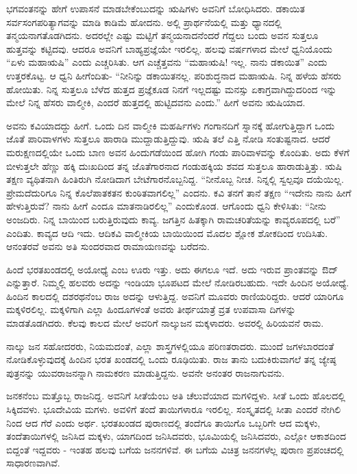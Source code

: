 ಭಗವಂತನನ್ನು ಹೇಗೆ ಉಪಾಸನೆ ಮಾಡಬೇಕೆಂಬುದನ್ನು ಋಷಿಗಳು ಅವನಿಗೆ ಬೋಧಿಸಿದರು. ಡಕಾಯಿತ ಸರ್ವಸಂಗಪರಿತ್ಯಾಗವನ್ನು ಮಾಡಿ ಕಾಡಿಮೆ ಹೋದನು. ಅಲ್ಲಿ ಪ್ರಾರ್ಥನೆಯಲ್ಲಿ ಮತ್ತು ಧ್ಯಾನದಲ್ಲಿ ತನ್ಮಯನಾಗತೊಡಗಿದನು. ಅದರಲ್ಲೇ ಎಷ್ಟು ಮಟ್ಟಿಗೆ ತನ್ಮಯನಾದನೆಂದರೆ ಗೆದ್ದಲು ಬಂದು ಅವನ ಸುತ್ತಲೂ ಹುತ್ತವನ್ನು ಕಟ್ಟಿದವು. ಆದರೂ ಅವನಿಗೆ ಬಾಹ್ಯಪ್ರಜ್ಞೆಯೇ ಇರಲಿಲ್ಲ. ಹಲವು ವರ್ಷಗಳಾದ ಮೇಲೆ ಧ್ವನಿಯೊಂದು “ಏಳು ಮಹಾಋಷಿ” ಎಂದು ಎಚ್ಚರಿಸಿತು. ಆಗ ಎಚ್ಚೆತ್ತವನು “ಮಹಾಋಷಿ! ಇಲ್ಲ. ನಾನು ಡಕಾಯಿತ” ಎಂದು ಉತ್ತರಕೊಟ್ಟ. ಆ ಧ್ವನಿ ಹೀಗೆಂದಿತು- “ನೀನಿನ್ನು ಡಕಾಯಿತನಲ್ಲ. ಪರಿಶುದ್ಧನಾದ ಮಹಾಋಷಿ. ನಿನ್ನ ಹಳೆಯ ಹೆಸರು ಹೋಯಿತು. ನಿನ್ನ ಸುತ್ತಲೂ ಬೆಳೆದ ಹುತ್ತದ ಪ್ರಜ್ಞೆಕೂಡ ನಿನಗೆ ಇಲ್ಲದಷ್ಟು ಮನಸ್ಸು ಏಕಾಗ್ರವಾಗಿದ್ದುದರಿಂದ ಇನ್ನು ಮೇಲೆ ನಿನ್ನ ಹೆಸರು ವಾಲ್ಮೀಕಿ, ಎಂದರೆ ಹುತ್ತದಲ್ಲಿ ಹುಟ್ಟಿದವನು ಎಂದು.” ಹೀಗೆ ಅವನು ಋಷಿಯಾದ.

ಅವನು ಕವಿಯಾದದ್ದು ಹೀಗೆ. ಒಂದು ದಿನ ವಾಲ್ಮೀಕಿ ಮಹರ್ಷಿಗಳು ಗಂಗಾನದಿಗೆ ಸ್ನಾನಕ್ಕೆ ಹೋಗುತ್ತಿದ್ದಾಗ ಒಂದು ಜೊತೆ ಪಾರಿವಾಳಗಳು ಸುತ್ತಲೂ ಹಾರಾಡಿ ಮುದ್ದಾಡುತ್ತಿದ್ದುವು. ಋಷಿ ತಲೆ ಎತ್ತಿ ನೋಡಿ ಸಂತುಷ್ಟನಾದ. ಆದರೆ ಮರುಕ್ಷಣದಲ್ಲಿಯೇ ಒಂದು ಬಾಣ ಅವನ ಹಿಂದುಗಡೆಯಿಂದ ಹೋಗಿ ಗಂಡು ಪಾರಿವಾಳವನ್ನು ಕೊಂದಿತು. ಅದು ಕೆಳಗೆ ಬೀಳುತ್ತಲೇ ಹೆಣ್ಣು ಹಕ್ಕಿ ದುಃಖದಿಂದ ತನ್ನ ಜೊತೆಗಾರನಾದ ಗಂಡುಹಕ್ಕಿಯ ಶವದ ಸುತ್ತಲೂ ಹಾರಾಡುತ್ತಿತ್ತು. ಋಷಿ ತಕ್ಷಣ ವ್ಯಥಿತನಾಗಿ ಹಿಂತಿರುಗಿ ನೋಡಿದಾಗ ಬೇಟೆಗಾರನೊಬ್ಬನಿದ್ದ. “ನೀನೊಬ್ಬ ನೀಚ. ನಿನ್ನಲ್ಲಿ ಸ್ವಲ್ಪವೂ ದಯೆಯಿಲ್ಲ. ಪ್ರೇಮದೆದುರಿಗೂ ನಿನ್ನ ಕೊಲೆಪಾತಕತನ ಕುಂಠಿತವಾಗಲಿಲ್ಲ” ಎಂದನು. ಕವಿ ತನಗೆ ತಾನೆ ತಕ್ಷಣ “ಇದೇನು ನಾನು ಹೀಗೆ ಹೇಳುತ್ತಿರುವೆ? ನಾನು ಹೀಗೆ ಎಂದೂ ಮಾತನಾಡಿರಲಿಲ್ಲ” ಎಂದುಕೊಂಡ. ಆಗೊಂದು ಧ್ವನಿ ಕೇಳಿಸಿತು: “ನೀನು ಅಂಜದಿರು. ನಿನ್ನ ಬಾಯಿಂದ ಬರುತ್ತಿರುವುದು ಕಾವ್ಯ. ಜಗತ್ತಿನ ಹಿತಕ್ಕಾಗಿ ರಾಮಚರಿತೆಯನ್ನು ಕಾವ್ಯರೂಪದಲ್ಲಿ ಬರೆ” ಎಂದಿತು. ಕಾವ್ಯದ ಆದಿ ಇದು. ಆದಿಕವಿ ವಾಲ್ಮೀಕಿಯ ಬಾಯಿಯಿಂದ ಮೊದಲ ಶ್ಲೋಕ ಶೋಕದಿಂದ ಉದಿಸಿತು. ಆನಂತರವೆ ಅವನು ಅತಿ ಸುಂದರವಾದ ರಾಮಾಯಣವನ್ನು ಬರೆದನು.

ಹಿಂದೆ ಭರತಖಂಡದಲ್ಲಿ ಅಯೋಧ್ಯೆ ಎಂಬ ಊರು ಇತ್ತು. ಅದು ಈಗಲೂ ಇದೆ. ಅದು ಇರುವ ಪ್ರಾಂತವನ್ನು ಔದ್​ ಎನ್ನುತ್ತಾರೆ. ನಿಮ್ಮಲ್ಲಿ ಹಲವರು ಅದನ್ನು ಇಂಡಿಯಾ ಭೂಪಟದ ಮೇಲೆ ನೋಡಿರಬಹುದು. ಇದೇ ಹಿಂದಿನ ಅಯೋಧ್ಯೆ. ಹಿಂದಿನ ಕಾಲದಲ್ಲಿ ದಶರಥನೆಂಬ ರಾಜ ಅದನ್ನು ಆಳುತ್ತಿದ್ದ. ಅವನಿಗೆ ಮೂವರು ರಾಣಿಯರಿದ್ದರು. ಆದರೆ ಯಾರಿಗೂ ಮಕ್ಕಳಿರಲಿಲ್ಲ. ಮಕ್ಕಳಿಗಾಗಿ ಎಲ್ಲಾ ಹಿಂದೂಗಳಂತೆ ಅವರು ತೀರ್ಥಯಾತ್ರೆ ವ್ರತ ಉಪವಾಸಾ ದಿಗಳನ್ನು ಮಾಡತೊಡಗಿದರು. ಕೆಲವು ಕಾಲದ ಮೇಲೆ ಅವರಿಗೆ ನಾಲ್ಕುಜನ ಮಕ್ಕಳಾದರು. ಅವರಲ್ಲಿ ಹಿರಿಯವನೆ ರಾಮ.

ನಾಲ್ಕು ಜನ ಸಹೋದರರು, ನಿಯಮದಂತೆ, ಎಲ್ಲಾ ಶಾಸ್ತ್ರಗಳಲ್ಲಿಯೂ ಪರಿಣತರಾದರು. ಮುಂದೆ ಜಗಳಬಾರದಂತೆ ನೋಡಿಕೊಳ್ಳುವುದಕ್ಕೆ ಹಿಂದಿನ ಭರತ ಖಂಡದಲ್ಲಿ ಒಂದು ರೂಢಿಯಿತು. ರಾಜ ತಾನು ಬದುಕಿರುವಾಗಲೆ ತನ್ನ ಜ್ಯೇಷ್ಠ ಪುತ್ರನನ್ನು ಯುವರಾಜನನ್ನಾಗಿ ನಾಮಕರಣ ಮಾಡುತ್ತಿದ್ದನು. ಅವನೇ ಅನಂತರ ರಾಜನಾಗುವನು.

ಜನಕನೆಂಬ ಮತ್ತೊಬ್ಬ ರಾಜನಿದ್ದ. ಅವನಿಗೆ ಸೀತೆಯೆಂಬ ಅತಿ ಚೆಲುವೆಯಾದ ಮಗಳಿದ್ದಳು. ಸೀತೆ ಒಂದು ಹೊಲದಲ್ಲಿ ಸಿಕ್ಕಿದವಳು. ಭೂದೇವಿಯ ಮಗಳು. ಅವಳಿಗೆ ತಂದೆ ತಾಯಿಗಳಾರೂ ಇರಲಿಲ್ಲ. ಸಂಸ್ಕೃತದಲ್ಲಿ ಸೀತಾ ಎಂದರೆ ನೇಗಿಲಿ ನಿಂದ ಆದ ಗೆರೆ ಎಂದು ಅರ್ಥ. ಭರತಖಂಡದ ಪುರಾಣದಲ್ಲಿ ತಂದೆಗೂ ತಾಯಿಗೊ ಒಬ್ಬರಿಗೇ ಆದ ಮಕ್ಕಳು, ತಂದೆತಾಯಿಗಳಲ್ಲಿ ಜನಿಸಿದ ಮಕ್ಕಳು, ಯಾಗದಿಂದ ಜನಿಸಿದವರು, ಭೂಮಿಯಲ್ಲಿ ಜನಿಸಿದವರು, ಎಲ್ಲೋ ಆಕಾಶದಿಂದ ಬಿದ್ದಂತೆ ಇದ್ದವರು - ಇಂತಹ ಹಲವು ಬಗೆಯ ಜನನಗಳಿವೆ. ಈ ಬಗೆಯ ವಿಚಿತ್ರ ಜನನಗಳೆಲ್ಲ ಪುರಾಣ ಪ್ರಪಂಚದಲ್ಲಿ ಸಾಧಾರಣವಾಗಿವೆ.

